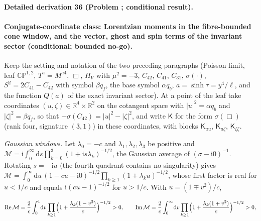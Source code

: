 \paragraph{Detailed derivation 36 (Problem ; conditional result).} \label{ref:detail-35} %



\paragraph{Conjugate-coordinate class: Lorentzian moments in the fibre-bounded cone window, and the vector, ghost and spin terms of the invariant sector (conditional; bounded no-go).}

Keep the setting and notation of the two preceding paragraphs (Poisson limit, leaf \(\mathbb{CP}^{1,2}\), \(T^a=M^{a4}\), \(\Box\), \(H_V\) with \(\mu^2=-3\), \(C_{42}\), \(C_{41}\), \(C_{31}\), \(\sigma(\cdot)\), \(S^2=2C_{41}-C_{42}\) with symbol \(\beta q_f\), the base symbol \(\alpha q_b\), \(a=\sinh\tau=y^4/\ell\), and the function \(Q(a)\) of the exact invariant sector). At a point of the leaf take coordinates \((u,\zeta)\in\mathbb R^4\times\mathbb R^2\) on the cotangent space with \(|u|^2=\alpha q_b\) and \(|\zeta|^2=\beta q_f\), so that \(-\sigma(C_{42})=|u|^2-|\zeta|^2\), and write \(\mathsf K\) for the form \(\sigma(\Box)\) (rank four, signature \((3,1)\)) in these coordinates, with blocks \(\mathsf K_{uu}\), \(\mathsf K_{u\zeta}\), \(\mathsf K_{\zeta\zeta}\).



\emph{Gaussian windows.} Let \(\lambda_0=-c\) and \(\lambda_1,\lambda_2,\lambda_3\) be positive and \(\mathcal M=\mathrm i\int_0^\infty\mathrm ds\prod_{k=0}^3(1+\mathrm is\lambda_k)^{-1/2}\), the Gaussian average of \((\sigma-\mathrm i0)^{-1}\). Rotating \(s=-\mathrm iu\) (the fourth quadrant contains no singularity) gives \(\mathcal M=\int_0^\infty\mathrm du\,(1-cu-\mathrm i0)^{-1/2}\prod_{k\ge1}(1+\lambda_ku)^{-1/2}\), whose first factor is real for \(u<1/c\) and equals \(\mathrm i(cu-1)^{-1/2}\) for \(u>1/c\). With \(u=(1\mp v^2)/c\),

\[

  \operatorname{Re}\mathcal M=\frac2c\int_0^1\!\mathrm dv\prod_{k\ge1}\Bigl(1+\frac{\lambda_k(1-v^2)}c\Bigr)^{-1/2}>0,\qquad

  \operatorname{Im}\mathcal M=\frac2c\int_0^\infty\!\mathrm dv\prod_{k\ge1}\Bigl(1+\frac{\lambda_k(1+v^2)}c\Bigr)^{-1/2}>0 ,

\]

